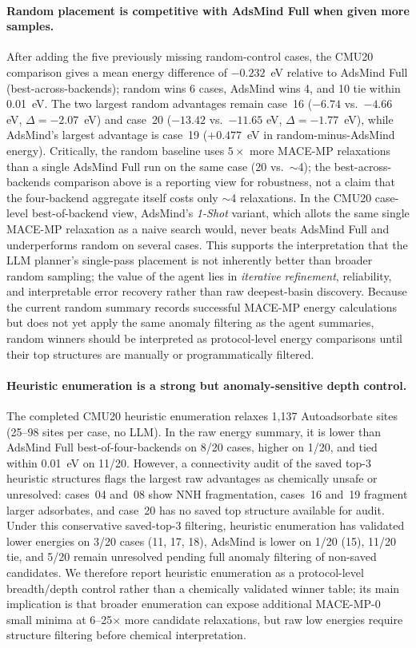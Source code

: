 \paragraph{Random placement is competitive with AdsMind Full when given more samples.}
After adding the five previously missing random-control cases, the CMU20 comparison gives a mean energy difference of $-0.232$~eV relative to AdsMind Full (best-across-backends); random wins 6 cases, AdsMind wins 4, and 10 tie within 0.01~eV.
The two largest random advantages remain case~16 ($-6.74$ vs.\ $-4.66$ eV, $\Delta = -2.07$~eV) and case~20 ($-13.42$ vs.\ $-11.65$ eV, $\Delta = -1.77$~eV), while AdsMind's largest advantage is case~19 ($+0.477$~eV in random-minus-AdsMind energy).
Critically, the random baseline uses $5\times$ more MACE-MP relaxations than a single AdsMind Full run on the same case (20 vs.\ $\sim$4); the best-across-backends comparison above is a reporting view for robustness, not a claim that the four-backend aggregate itself costs only $\sim$4 relaxations.
In the CMU20 case-level best-of-backend view, AdsMind's \textit{1-Shot} variant, which allots the same single MACE-MP relaxation as a naive search would, never beats AdsMind Full and underperforms random on several cases.
This supports the interpretation that the LLM planner's single-pass placement is not inherently better than broader random sampling; the value of the agent lies in \textit{iterative refinement}, reliability, and interpretable error recovery rather than raw deepest-basin discovery.
Because the current random summary records successful MACE-MP energy calculations but does not yet apply the same anomaly filtering as the agent summaries, random winners should be interpreted as protocol-level energy comparisons until their top structures are manually or programmatically filtered.

\paragraph{Heuristic enumeration is a strong but anomaly-sensitive depth control.}
The completed CMU20 heuristic enumeration relaxes 1{,}137 Autoadsorbate sites (25--98 sites per case, no LLM).
In the raw energy summary, it is lower than AdsMind Full best-of-four-backends on 8/20 cases, higher on 1/20, and tied within 0.01~eV on 11/20.
However, a connectivity audit of the saved top-3 heuristic structures flags the largest raw advantages as chemically unsafe or unresolved: cases~04 and~08 show NNH fragmentation, cases~16 and~19 fragment larger adsorbates, and case~20 has no saved top structure available for audit.
Under this conservative saved-top-3 filtering, heuristic enumeration has validated lower energies on 3/20 cases (11, 17, 18), AdsMind is lower on 1/20 (15), 11/20 tie, and 5/20 remain unresolved pending full anomaly filtering of non-saved candidates.
We therefore report heuristic enumeration as a protocol-level breadth/depth control rather than a chemically validated winner table; its main implication is that broader enumeration can expose additional MACE-MP-0 small minima at 6--25$\times$ more candidate relaxations, but raw low energies require structure filtering before chemical interpretation.

